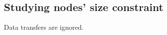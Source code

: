 \documentclass[a4paper]{article}
\begin{document}
\subsection{Studying nodes' size constraint}

Data transfers are ignored.


\end{document}
